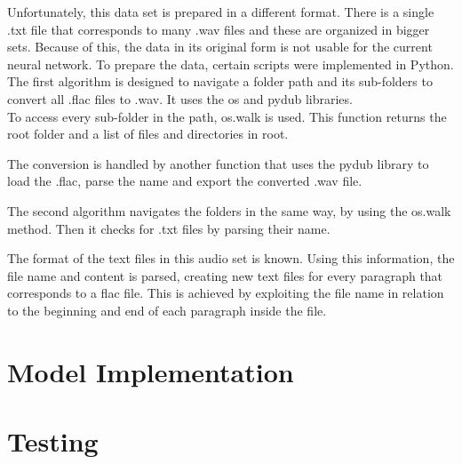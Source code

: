 Unfortunately, this data set is prepared in a different format. There is a single .txt file that corresponds to many .wav files and these are organized in bigger sets. Because of this, the data in its original form is not usable for the current neural network. To prepare the data, certain scripts were implemented in Python.\\

The first algorithm is designed to navigate a folder path and its sub-folders to convert all .flac files to .wav. It uses the os and pydub libraries.  \\
To access every sub-folder in the path, os.walk is used. This function returns the root folder and a list of files and directories in root. 



The conversion is handled by another function that uses the pydub library to load the .flac, parse the name and   export the converted .wav file.



The second algorithm navigates the folders in the same way, by using the os.walk method. Then it checks for .txt files by parsing their name. 



The format of the text files in this audio set is known. Using this information, the file name and content is parsed, creating new text files for every paragraph that corresponds to a flac file. This is achieved by exploiting the file name in relation to the beginning and end of each paragraph inside the file.
 
 
 
\section{Model Implementation}






\section{Testing}










